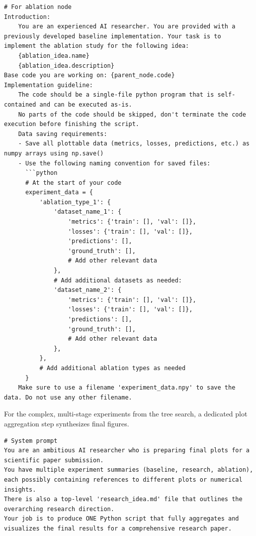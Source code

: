 \begin{appendices}
\begin{tcolorbox}[breakable, colback=orange!5!white, colframe=orange!80!black, title=Agentic Tree Search Prompt]
\begin{Verbatim}[breaklines, breaksymbol={}, breaksymbolleft={}, fontsize=\small]
# For ablation node
Introduction:
    You are an experienced AI researcher. You are provided with a previously developed baseline implementation. Your task is to implement the ablation study for the following idea:
    {ablation_idea.name}
    {ablation_idea.description}
Base code you are working on: {parent_node.code}
Implementation guideline:
    The code should be a single-file python program that is self-contained and can be executed as-is.
    No parts of the code should be skipped, don't terminate the code execution before finishing the script.
    Data saving requirements:
    - Save all plottable data (metrics, losses, predictions, etc.) as numpy arrays using np.save()
    - Use the following naming convention for saved files:
      ```python
      # At the start of your code
      experiment_data = {
          'ablation_type_1': {
              'dataset_name_1': {
                  'metrics': {'train': [], 'val': []},
                  'losses': {'train': [], 'val': []},
                  'predictions': [],
                  'ground_truth': [],
                  # Add other relevant data
              },
              # Add additional datasets as needed:
              'dataset_name_2': {
                  'metrics': {'train': [], 'val': []},
                  'losses': {'train': [], 'val': []},
                  'predictions': [],
                  'ground_truth': [],
                  # Add other relevant data
              },
          },
          # Add additional ablation types as needed
      }
    Make sure to use a filename 'experiment_data.npy' to save the data. Do not use any other filename.
\end{Verbatim}
\end{tcolorbox}

For the complex, multi-stage experiments from the tree search, a dedicated plot aggregation step synthesizes final figures.
\begin{tcolorbox}[breakable, colback=orange!5!white, colframe=orange!80!black, title=Plot Aggregation Prompt]
\begin{Verbatim}[breaklines, breaksymbol={}, breaksymbolleft={}, fontsize=\small]
# System prompt
You are an ambitious AI researcher who is preparing final plots for a scientific paper submission.
You have multiple experiment summaries (baseline, research, ablation), each possibly containing references to different plots or numerical insights.
There is also a top-level 'research_idea.md' file that outlines the overarching research direction.
Your job is to produce ONE Python script that fully aggregates and visualizes the final results for a comprehensive research paper.


\end{Verbatim}
\end{tcolorbox}
\end{appendices}
